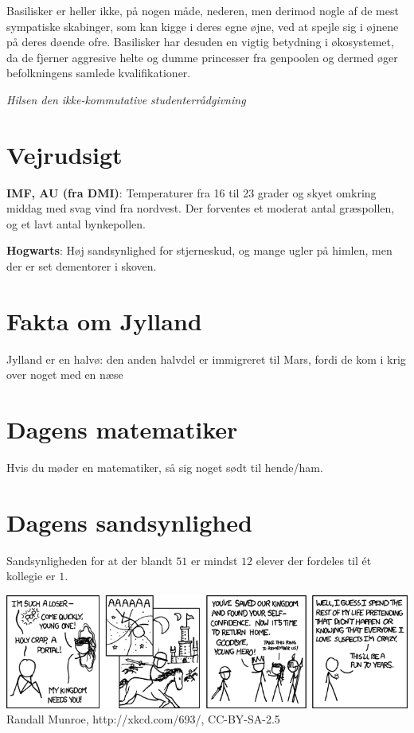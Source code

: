 \begin{minipage}[b]{0.95\linewidth}
\begin{minipage}[t]{0.47\textwidth}
Basilisker er heller ikke, på nogen måde, nederen, men derimod nogle af de mest sympatiske skabinger, som kan kigge i deres egne øjne, ved at spejle sig i øjnene på deres døende ofre. Basilisker har desuden en vigtig betydning i økosystemet, da de fjerner aggresive helte og dumme princesser fra genpoolen og dermed øger befolkningens samlede kvalifikationer.

{\flushright\emph{Hilsen den ikke-kommutative studenterrådgivning}}

\end{minipage}%
\hfill\begin{minipage}[t]{0.47\textwidth}
\vspace{2mm}
\section*{Vejrudsigt}
\textbf{IMF, AU (fra DMI)}: Temperaturer fra 16 til 23 grader og skyet omkring middag med svag vind fra nordvest. Der forventes et moderat antal græspollen, og et lavt antal bynkepollen.

\textbf{Hogwarts}: Høj sandsynlighed for stjerneskud, og mange ugler på himlen, men der er set dementorer i skoven.

\section*{Fakta om Jylland}
Jylland er en halvø: den anden halvdel er immigreret til Mars, fordi de kom i krig over noget med en næse

\section*{Dagens matematiker}
Hvis du møder en matematiker, så sig noget sødt til hende/ham.

\section*{Dagens sandsynlighed}
Sandsynligheden for at der blandt $51$ er mindst $12$ elever der fordeles til ét kollegie er $1$. 

\end{minipage}

\begin{center}
\includegraphics[width=\linewidth]{childrens_fantasy.png}
\tiny Randall Munroe, http://xkcd.com/693/, CC-BY-SA-2.5


\end{center}
\end{minipage}
